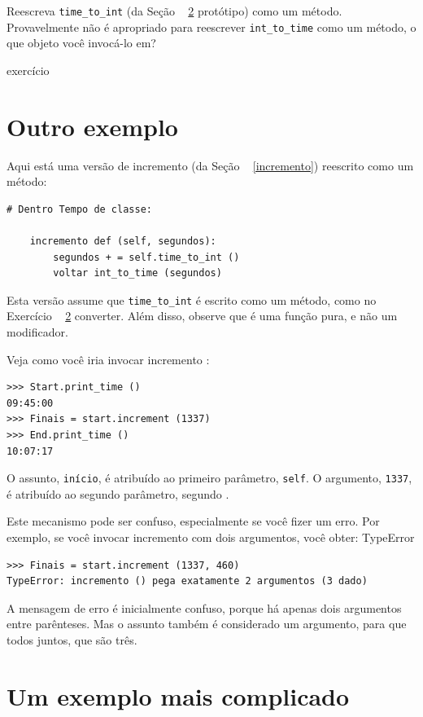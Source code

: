 \documentclass[10pt]{book}
\begin{document}
\begin{v erbatim}
{\begin{}
Reescreva \verb "time_to_int" (da Seção ~ \ref {} protótipo) como um método.
Provavelmente não é apropriado para reescrever \verb "int_to_time" como um
método, o que objeto você invocá-lo em?

\end{} exercício


\section{Outro exemplo}

Aqui está uma versão de incremento {\tt} (da Seção ~ \ref {incremento})
reescrito como um método:

\begin{verbatim}
# Dentro Tempo de classe:

    incremento def (self, segundos):
        segundos + = self.time_to_int ()
        voltar int_to_time (segundos)
\end{verbatim}
%
Esta versão assume que \verb "time_to_int" é escrito
como um método, como no Exercício ~ \ref {} converter. Além disso, observe que
é uma função pura, e não um modificador.

Veja como você iria invocar {incremento \tt}:

\begin{verbatim}
>>> Start.print_time ()
09:45:00
>>> Finais = start.increment (1337)
>>> End.print_time ()
10:07:17
\end{verbatim}
%
O assunto, {\tt início}, é atribuído ao primeiro parâmetro,
{\tt self}. O argumento, {\tt 1337}, é atribuído ao
segundo parâmetro, segundo {\tt}.

Este mecanismo pode ser confuso, especialmente se você fizer um erro.
Por exemplo, se você invocar {incremento \tt} com dois argumentos, você
obter:
\index{} TypeError

\begin{verbatim}
>>> Finais = start.increment (1337, 460)
TypeError: incremento () pega exatamente 2 argumentos (3 dado)
\end{verbatim}
%
A mensagem de erro é inicialmente confuso, porque há
apenas dois argumentos entre parênteses. Mas o assunto também é
considerado um argumento, para que todos juntos, que são três.


\section{Um exemplo mais complicado}

}
\end{v erbatim}
\end{document}
